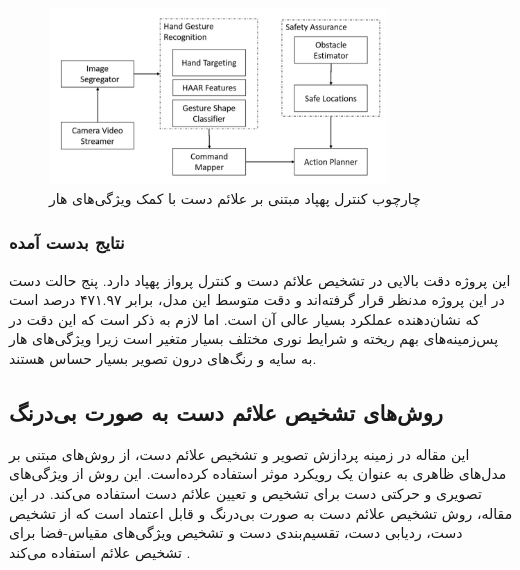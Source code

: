 \begin{figure}[h]
    \centering
    \includegraphics[width=0.8\textwidth]{Haar2.png}
    \caption[چارچوب کنترل پهپاد مبتنی بر علائم دست با کمک ویژگی‌های هار]{چارچوب کنترل پهپاد مبتنی بر علائم دست با کمک ویژگی‌های هار\cite{natarajan2018hand}}
\end{figure}

\subsubsection{\protect\textbf{نتایج بدست آمده}}
این پروژه دقت بالایی در تشخیص علائم دست و کنترل پرواز پهپاد دارد. پنج حالت دست در این پروژه مدنظر قرار گرفته‌اند و دقت متوسط این مدل، برابر ۴۷۱.۹۷ درصد 
است که نشان‌دهنده عملکرد بسیار عالی آن است. اما لازم به ذکر است که این دقت در پس‌زمینه‌های بهم ریخته و شرایط نوری مختلف 
بسیار متغیر است زیرا ویژگی‌های هار به سایه و رنگ‌های درون تصویر بسیار حساس هستند.



\subsection{روش‌های تشخیص علائم دست به صورت بی‌درنگ}
این مقاله در زمینه پردازش تصویر و تشخیص علائم‌ دست، از روش‌های مبتنی بر مدل‌های ظاهری به عنوان یک رویکرد موثر استفاده کرده‌‌است.
این روش‌ از ویژگی‌های تصویری و حرکتی دست برای تشخیص و تعیین علائم‌ دست استفاده می‌کند. در این مقاله، روش تشخیص علائم دست به صورت بی‌درنگ و 
قابل اعتماد است که  از تشخیص دست، ردیابی دست، تقسیم‌بندی دست و تشخیص ویژگی‌های مقیاس-فضا برای تشخیص علائم استفاده می‌کند \cite{fang2007real}.


